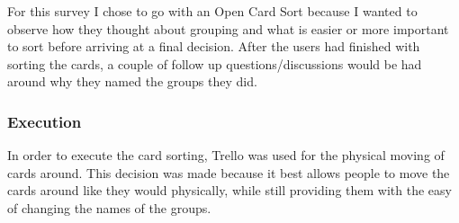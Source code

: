 For this survey I chose to go with an Open Card Sort because I wanted to observe how they thought about grouping and what is easier or more important to sort before arriving at a final decision. After the users had finished with sorting the cards, a couple of follow up questions/discussions would be had around why they named the groups they did.

\subsubsection{Execution}
In order to execute the card sorting, Trello was used for the physical moving of cards around. This decision was made because it best allows people to move the cards around like they would physically, while still providing them with the easy of changing the names of the groups.

